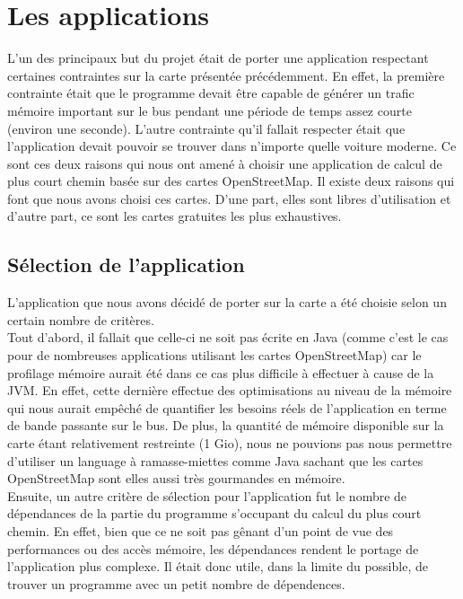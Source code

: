 \section{Les applications}

L'un des principaux but du projet était de porter une application respectant 
certaines contraintes sur la carte présentée précédemment. En effet, la 
première contrainte était que le programme devait être capable de générer un 
trafic mémoire important sur le bus pendant une période de temps assez courte 
(environ une seconde). L'autre contrainte qu'il fallait respecter était que 
l'application devait pouvoir se trouver dans n'importe quelle voiture moderne. 
Ce sont ces deux raisons qui nous ont amené à choisir une application de calcul 
de plus court chemin basée sur des cartes OpenStreetMap. Il existe deux raisons 
qui font que nous avons choisi ces cartes. D'une part, elles sont libres 
d'utilisation et d'autre part, ce sont les cartes gratuites les plus 
exhaustives. 

\subsection{Sélection de l'application}

L'application que nous avons décidé de porter sur la carte a été choisie selon 
un certain nombre de critères. \\

Tout d'abord, il fallait que celle-ci ne soit pas écrite en Java (comme c'est 
le cas pour de nombreuses applications utilisant les cartes OpenStreetMap) car 
le profilage mémoire aurait été dans ce cas plus difficile à effectuer à cause 
de la JVM. En effet, cette dernière effectue des optimisations au niveau de la 
mémoire qui nous aurait empêché de quantifier les besoins réels de 
l'application en terme de bande passante sur le bus. De plus, la quantité de 
mémoire disponible sur la carte étant relativement restreinte (1 Gio), nous ne 
pouvions pas nous permettre d'utiliser un language à ramasse-miettes comme 
Java sachant que les cartes OpenStreetMap sont elles aussi très gourmandes en 
mémoire. \\

Ensuite, un autre critère de sélection pour l'application fut le nombre de 
dépendances de la partie du programme s'occupant du calcul du plus court 
chemin. En effet, bien que ce ne soit pas gênant d'un point de vue des 
performances ou des accès mémoire, les dépendances rendent le portage de 
l'application plus complexe. Il était donc utile, dans la limite du possible, 
de trouver un programme avec un petit nombre de dépendences. \\

